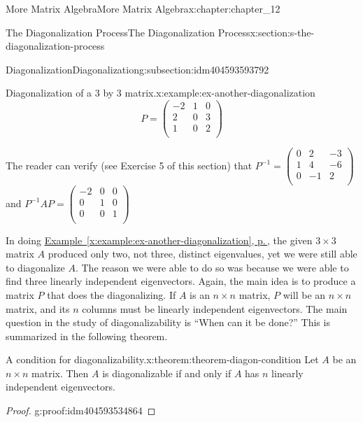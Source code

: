 \documentclass[twoside,10pt,]{book}
\newcommand{\xreffont}{\relax}
\numberwithin{equation}{section}
\begin{document}
\begin{chapterptx}{More Matrix Algebra}{}{More Matrix Algebra}{}{}{x:chapter:chapter_12}
\begin{sectionptx}{The Diagonalization Process}{}{The Diagonalization Process}{}{}{x:section:s-the-diagonalization-process}
\begin{subsectionptx}{Diagonalization}{}{Diagonalization}{}{}{g:subsection:idm404593593792}
\begin{example}{Diagonalization of a 3 by 3 matrix.}{x:example:ex-another-diagonalization}
\begin{equation*}
P= \left(
\begin{array}{ccc}
-2 & 1 & 0 \\
2 & 0 & 3 \\
1 & 0 & 2 \\
\end{array}
\right)
\end{equation*}
%
\par
The reader can verify (see Exercise 5 of this section) that \(P^{-1}= \left(
\begin{array}{ccc}
0 & 2 & -3 \\
1 & 4 & -6 \\
0 & -1 & 2 \\
\end{array}
\right)\)   and   \(P^{-1}A P = \left(
\begin{array}{ccc}
-2 & 0 & 0 \\
0 & 1 & 0 \\
0 & 0 & 1 \\
\end{array}
\right)\)%
\end{example}
In doing \hyperref[x:example:ex-another-diagonalization]{Example~{\xreffont\ref{x:example:ex-another-diagonalization}}, p.\,\pageref{x:example:ex-another-diagonalization}}, the given \(3\times 3\) matrix \(A\) produced only two, not three, distinct eigenvalues, yet we were still able to diagonalize \(A\). The reason we were able to do so was because we were able to find three linearly independent eigenvectors. Again, the main idea is to produce a matrix \(P\) that does the diagonalizing. If \(A\) is an \(n \times  n\) matrix, \(P\) will be an \(n\times
n\) matrix, and its \(n\) columns must be linearly independent eigenvectors. The main question in the study of diagonalizability is ``When can it be done?'' This is summarized in the following theorem.%
\begin{theorem}{A condition for diagonalizability.}{}{x:theorem:theorem-diagon-condition}%
Let \(A\) be an \(n \times  n\) matrix.   Then \(A\) is diagonalizable if and only if \(A\) has \(n\) linearly independent eigenvectors.%
\end{theorem}
\begin{proof}{}{g:proof:idm404593534864}

\end{proof}
\end{subsectionptx}
\end{sectionptx}
\end{chapterptx}
\end{document}
